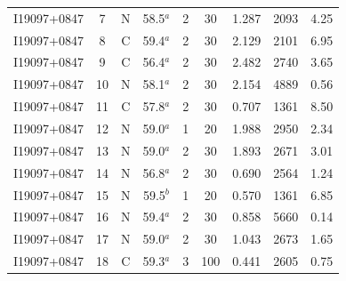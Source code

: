 \begin{table}
\begin{tabular}{ccccccccc}
I19097+0847 & 7 & N & 58.5$^{a}$ & 2 & 30 & 1.287 & 2093 & 4.25 \\
I19097+0847 & 8 & C & 59.4$^{a}$ & 2 & 30 & 2.129 & 2101 & 6.95 \\
I19097+0847 & 9 & C & 56.4$^{a}$ & 2 & 30 & 2.482 & 2740 & 3.65 \\
I19097+0847 & 10 & N & 58.1$^{a}$ & 2 & 30 & 2.154 & 4889 & 0.56 \\
I19097+0847 & 11 & C & 57.8$^{a}$ & 2 & 30 & 0.707 & 1361 & 8.50 \\
I19097+0847 & 12 & N & 59.0$^{a}$ & 1 & 20 & 1.988 & 2950 & 2.34 \\
I19097+0847 & 13 & N & 59.0$^{a}$ & 2 & 30 & 1.893 & 2671 & 3.01 \\
I19097+0847 & 14 & N & 56.8$^{a}$ & 2 & 30 & 0.690 & 2564 & 1.24 \\
I19097+0847 & 15 & N & 59.5$^{b}$ & 1 & 20 & 0.570 & 1361 & 6.85 \\
I19097+0847 & 16 & N & 59.4$^{a}$ & 2 & 30 & 0.858 & 5660 & 0.14 \\
I19097+0847 & 17 & N & 59.0$^{a}$ & 2 & 30 & 1.043 & 2673 & 1.65 \\
I19097+0847 & 18 & C & 59.3$^{a}$ & 3 & 100 & 0.441 & 2605 & 0.75 \\
\end{tabular}
\end{table}
